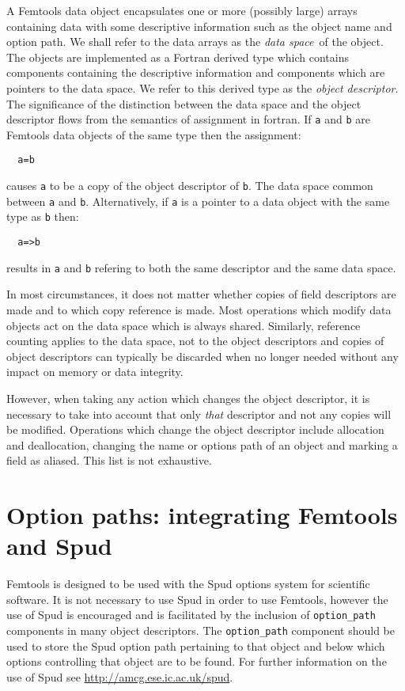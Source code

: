 \documentclass[a4paper, 11pt]{book}
\begin{document}
A Femtools data object encapsulates one or more (possibly large) arrays
containing data with some descriptive information such as the object name
and option path. We shall refer to the data arrays as the \emph{data space}\
of the object. The objects are implemented as a Fortran derived type which
contains components containing the descriptive information and components
which are pointers to the data space. We refer to this derived type as the
\emph{object descriptor}. The significance of the distinction between the
data space and the object descriptor flows from the semantics of assignment
in fortran. If \lstinline+a+ and \lstinline+b+ are Femtools data objects of
the same type then the assignment:
\begin{lstlisting}
  a=b
\end{lstlisting}
causes \lstinline+a+ to be a copy of the object descriptor of \lstinline+b+.
The data space common between \lstinline+a+ and
\lstinline+b+. Alternatively, if \lstinline+a+ is a pointer to a data object
with the same type as \lstinline+b+ then:
\begin{lstlisting}
  a=>b
\end{lstlisting}
results in \lstinline+a+ and \lstinline+b+ refering to both the same
descriptor and the same data space.

In most circumstances, it does not matter whether copies of field
descriptors are made and to which copy reference is made. Most operations
which modify data objects act on the data space which is always
shared. Similarly, reference counting applies to the data space, not to the
object descriptors and copies of object descriptors can typically be
discarded when no longer needed without any impact on memory or data
integrity.

However, when taking any action which changes the object descriptor, it is
necessary to take into account that only \emph{that} descriptor and not any
copies will be modified. Operations which change the object descriptor
include allocation and deallocation, changing the name or options path of an
object and marking a field as aliased. This list is not exhaustive.

\section{Option paths: integrating Femtools and Spud}

Femtools is designed to be used with the Spud options system for scientific
software. It is not necessary to use Spud in order to use Femtools, however
the use of Spud is encouraged and is facilitated by the inclusion of
\lstinline+option_path+ components in many object descriptors. The
\lstinline+option_path+ component should be used to store the Spud option
path pertaining to that object and below which options controlling that
object are to be found. For further information on the use of Spud see
\url{http://amcg.ese.ic.ac.uk/spud}. 
\end{document}
